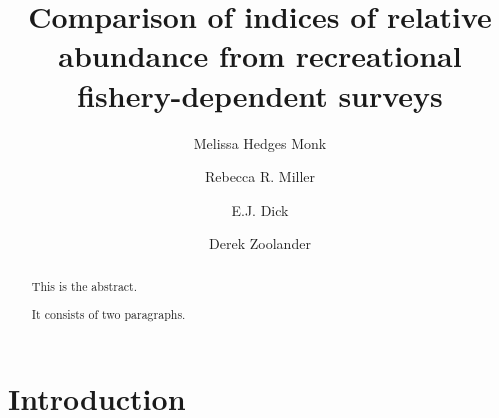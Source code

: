 \documentclass[]{elsarticle} %
\begin{document}
\begin{frontmatter}

  \title{Comparison of indices of relative abundance from recreational
fishery-dependent surveys}
    \author[Southwest Fisheries Science Center]{Melissa Hedges Monk}
    \author[University of California Santa Cruz]{Rebecca R. Miller}
    \author[Another University]{E.J. Dick}
    \author[Southwest Fisheries Science Center]{Derek Zoolander}
      \address[Southwest Fisheries Science Center]{Fisheries Ecology
Division, Southwest Fisheries Science Center, National Marine Fisheries
Service, NOAA, 110 McAllister Way, Santa Cruz, CA 95066}
    \address[University of California Santa Cruz]{Department, Street,
City, State, Zip}
    
  \begin{abstract}
  This is the abstract.

  It consists of two paragraphs.
  \end{abstract}
  
 \end{frontmatter}

\hypertarget{introduction}{%
\section{Introduction}\label{introduction}}
\end{document}
